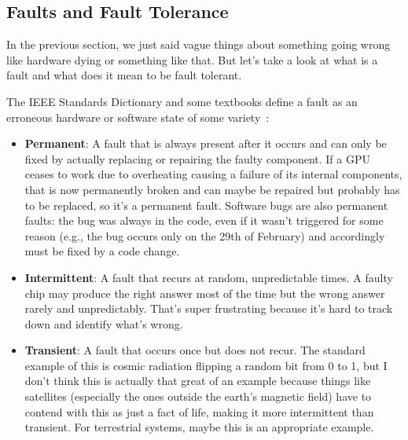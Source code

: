 \subsection*{Faults and Fault Tolerance}
In the previous section, we just said vague things about something going wrong like hardware dying or something like that. But let's take a look at what is a fault and what does it mean to be fault tolerant.

The IEEE Standards Dictionary and some textbooks define a fault as an erroneous hardware or software state of some variety~\cite{osi}:

\begin{itemize}
	\item \textbf{Permanent}: A fault that is always present after it occurs and can only be fixed by actually replacing or repairing the faulty component. If a GPU ceases to work due to overheating causing a failure of its internal components, that is now permanently broken and can maybe be repaired but probably has to be replaced, so it's a permanent fault. Software bugs are also permanent faults: the bug was always in the code, even if it wasn't triggered for some reason (e.g., the bug occurs only on the 29th of February) and accordingly must be fixed by a code change.
	
	
	\item \textbf{Intermittent}: A fault that recurs at random, unpredictable times. A faulty chip may produce the right answer most of the time but the wrong answer rarely and unpredictably. That's super frustrating because it's hard to track down and identify what's wrong.

	\item \textbf{Transient}: A fault that occurs once but does not recur. The standard example of this is cosmic radiation flipping a random bit from 0 to 1, but I don't think this is actually that great of an example because things like satellites (especially the ones outside the earth's magnetic field) have to contend with this as just a fact of life, making it more intermittent than transient. For terrestrial systems, maybe this is an appropriate example.

\end{itemize}




